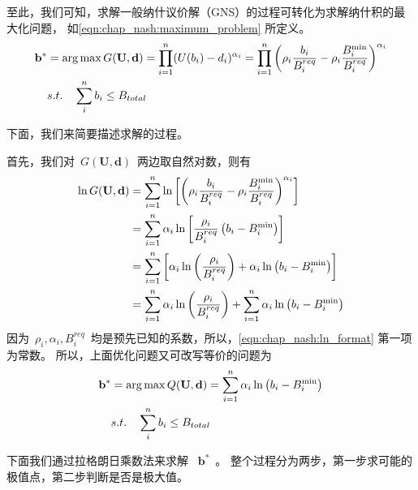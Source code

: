 至此，我们可知，求解一般纳什议价解（GNS）的过程可转化为求解纳什积的最大化问题，
如\eqref{eqn:chap_nash:maximum_problem} 所定义。
\begin{align}
    \mathbf{b}^* &= \arg \max G(\mathbf{U}, \mathbf{d}) = \prod_{i=1}^n (U(b_i) - d_i)^{\alpha_i} = \prod_{i=1}^{n} \left(\rho_i \frac{b_i}{B_i^{req}} - \rho_i \frac{B_i^{\min}}{B_i^{req}} \right)^{\alpha_i} \notag\\
    & s.t. \quad \sum_i^n b_i \le B_{total} 
    \label{eqn:chap_nash:maximum_problem}
\end{align}


下面，我们来简要描述求解的过程。

首先，我们对~$G(\mathbf{U}, \mathbf{d})$~两边取自然对数，则有
\begin{align}
    \ln G(\mathbf{U}, \mathbf{d}) &= \sum_{i=1}^{n} \ln \left[ \left(\rho_i \frac{b_i}{B_i^{req}} - \rho_i \frac{B_i^{\min}}{B_i^{req}} \right)^{\alpha_i} \right] \notag \notag\\
    &= \sum_{i=1}^{n} \alpha_i\ln \left[ \frac{\rho_i}{B_i^{req}} \left( b_i - B_i^{\min} \right) \right] \notag \\
    &= \sum_{i=1}^n \left[ \alpha_i \ln \left( \frac{\rho_i}{B_i^{req}} \right) + \alpha_i \ln \left( b_i - B_i^{\min} \right) \right] \notag\\
    &= \sum_{i=1}^n \alpha_i \ln \left( \frac{\rho_i}{B_i^{req}} \right) + \sum_{i=1}^n  \alpha_i \ln \left(b_i - B_i^{\min} \right) 
    \label{eqn:chap_nash:ln_format}
\end{align}
因为~$\rho_i, \alpha_i, B_i^{req}$~均是预先已知的系数，所以，\eqref{eqn:chap_nash:ln_format} 第一项为常数。
所以，上面优化问题又可改写等价的问题为
\begin{align}
    \mathbf{b}^* &= \arg \max Q(\mathbf{U}, \mathbf{d}) = \sum_{i=1}^n  \alpha_i \ln \left( b_i - B_i^{\min} \right) \notag\\
    & s.t. \quad \sum_i^n b_i \le B_{total} 
\end{align}

下面我们通过拉格朗日乘数法来求解 ~$\mathbf{b}^*$~。
整个过程分为两步，第一步求可能的极值点，第二步判断是否是极大值。

